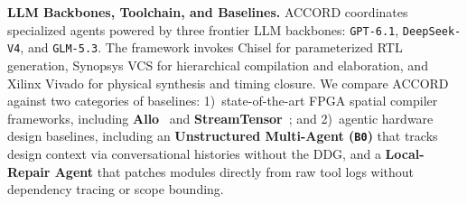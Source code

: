 \documentclass[9pt,conference]{IEEEtran}
\begin{document}
\textbf{LLM Backbones, Toolchain, and Baselines.}
ACCORD coordinates specialized agents powered by three frontier LLM backbones: \texttt{GPT-6.1}, \texttt{DeepSeek-V4}, and \texttt{GLM-5.3}. The framework invokes Chisel for parameterized RTL generation, Synopsys VCS for hierarchical compilation and elaboration, and Xilinx Vivado for physical synthesis and timing closure. We compare ACCORD against two categories of baselines: 1)~state-of-the-art FPGA spatial compiler frameworks, including \textbf{Allo}~\cite{allo} and \textbf{StreamTensor}~\cite{streamtensor}; and 2)~agentic hardware design baselines, including an \textbf{Unstructured Multi-Agent (\texttt{B0})} that tracks design context via conversational histories without the DDG, and a \textbf{Local-Repair Agent} that patches modules directly from raw tool logs without dependency tracing or scope bounding.
\end{document}
